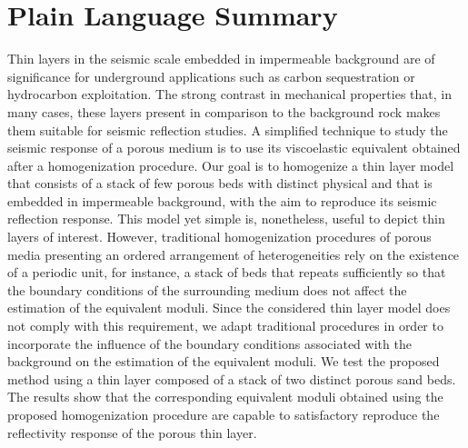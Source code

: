 \documentclass[draft]{agujournal2019}
\begin{document}
\section*{Plain Language Summary}
Thin layers in the seismic scale embedded in impermeable background are of significance for underground applications such as carbon sequestration or hydrocarbon exploitation. The strong contrast in mechanical properties that, in many cases, these layers present in comparison to the background rock makes them suitable for seismic reflection studies. A simplified technique to study the seismic response of a porous medium is to use its viscoelastic equivalent obtained after a homogenization procedure. Our goal is to  homogenize  a thin layer model that consists of a stack of few porous beds with distinct physical and that is embedded in impermeable background,  with the aim to reproduce its seismic reflection response. This model yet simple is, nonetheless, useful to depict thin layers of interest.
However, traditional homogenization procedures of porous media presenting an ordered arrangement of heterogeneities rely on the existence of a periodic unit, for instance, a stack of beds that repeats sufficiently so that the boundary conditions of the surrounding medium does not affect the estimation of the equivalent moduli. Since the considered thin layer model does not comply with this requirement, we adapt traditional procedures in order to incorporate the influence of the boundary conditions associated with the background on the estimation of the equivalent moduli. We test the proposed method using a thin layer composed of a stack of two distinct porous sand beds. The results show that the corresponding equivalent moduli obtained using the proposed homogenization procedure
 are capable to satisfactory reproduce the reflectivity response of the porous thin layer.

%
%

%

\end{document}
